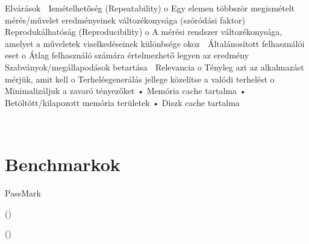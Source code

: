 Elvárások
 Ismételhetőség (Repeatability)
o Egy elemen többször megismételt mérés/művelet
eredményeinek változékonysága (szóródási faktor)
 Reprodukálhatóság (Reproducibility)
o A mérési rendszer változékonysága, amelyet a 
műveletek viselkedéseinek különbsége okoz
 Általánosított felhasználói eset
o Átlag felhasználó számára értelmezhető legyen az
eredmény
Szabványok/megállapodások betartása
 Relevancia
o Tényleg azt az alkalmazást mérjük, amit kell
o Terhelésgenerálás jellege közelítse a valódi terhelést
o Minimalizáljuk a zavaró tényezőket
• Memória cache tartalma
• Betöltött/kilapozott memória területek
• Diszk cache tartalma


~\cite{DBLP:books/mk/Gray93}



\section{Benchmarkok\kieg}

PassMark

 ()

 ()


